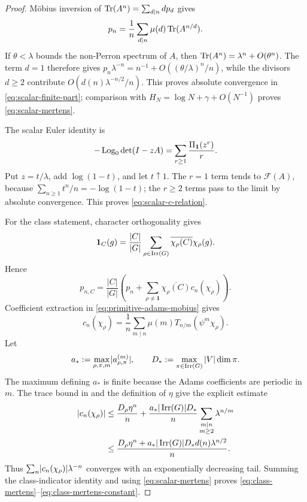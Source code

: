 \begin{proof}
M\"obius inversion of
\(\operatorname{Tr}(A^n)=\sum_{d\mid n}d p_d\) gives
\[
  p_n=\frac1n\sum_{d\mid n}\mu(d)\operatorname{Tr}(A^{n/d}).
\]
If \(\theta<\lambda\) bounds the non-Perron spectrum of \(A\), then
\(\operatorname{Tr}(A^n)=\lambda^n+O(\theta^n)\).  The term \(d=1\) therefore gives
\(p_n\lambda^{-n}=n^{-1}+O((\theta/\lambda)^n/n)\), while the divisors
\(d\geq2\) contribute \(O(d(n)\lambda^{-n/2}/n)\).  This proves absolute
convergence in \eqref{eq:scalar-finite-part}; comparison with
\(H_N=\log N+\gamma+O(N^{-1})\) proves \eqref{eq:scalar-mertens}.

The scalar Euler identity is
\[
  -\operatorname{Log}_0\det(I-zA)
  =\sum_{r\geq1}\frac{\Pi_{\mathbf1}(z^r)}r.
\]
Put \(z=t/\lambda\), add \(\log(1-t)\), and let \(t\uparrow1\).  The
\(r=1\) term tends to \(\mathcal F(A)\), because
\(\sum_{n\geq1}t^n/n=-\log(1-t)\); the \(r\geq2\) terms pass to the limit by
absolute convergence.  This proves \eqref{eq:scalar-c-relation}.

For the class statement, character orthogonality gives
\begin{equation}\label{eq:class-indicator}
  \mathbf1_C(g)=\frac{|C|}{|G|}
     \sum_{\rho\in\operatorname{Irr}(G)}
        \overline{\chi_\rho(C)}\chi_\rho(g).
\end{equation}
Hence
\[
  p_{n,C}=\frac{|C|}{|G|}
   \left(p_n+\sum_{\rho\neq\mathbf1}
     \overline{\chi_\rho(C)}c_n(\chi_\rho)\right).
\]
Coefficient extraction in \eqref{eq:primitive-adams-mobius} gives
\begin{equation}\label{eq:primitive-coefficient-bound-start}
  c_n(\chi_\rho)=\frac1n\sum_{m\mid n}\mu(m)
       T_{n/m}(\psi^m\chi_\rho).
\end{equation}
Let
\[
 a_*:=\max_{\rho,\pi,m}\lvert a_{\rho,\pi}^{(m)} \rvert,
 \qquad D_*:=\max_{\pi\in\operatorname{Irr}(G)}|V|\dim\pi.
\]
The maximum defining \(a_*\) is finite because the Adams coefficients are
periodic in \(m\).  The trace bound in
 and the definition of \(\eta\) give the
explicit estimate
\begin{align}
 \lvert c_n(\chi_\rho) \rvert
 &\le \frac{D_\rho\eta^n}{n}
   +\frac{a_*|\operatorname{Irr}(G)|D_*}{n}
       \sum_{\substack{m\mid n\\m\ge2}}\lambda^{n/m}
       \label{eq:explicit-primitive-trace-bound}\\
 &\le \frac{D_\rho\eta^n+
       a_*|\operatorname{Irr}(G)|D_*d(n)\lambda^{n/2}}{n}.
\end{align}
Thus \(\sum_n\lvert c_n(\chi_\rho) \rvert\lambda^{-n}\) converges with an
exponentially decreasing tail.  Summing the class-indicator identity and
using \eqref{eq:scalar-mertens} proves
\eqref{eq:class-mertens}--\eqref{eq:class-mertens-constant}.
\end{proof}

